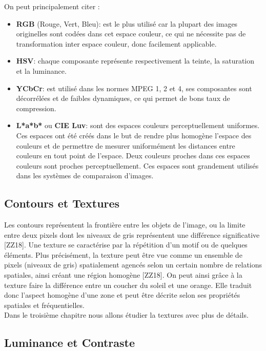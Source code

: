 On peut principalement citer :
\begin{itemize}
	\item \textbf{RGB} (Rouge, Vert, Bleu): est le plus utilisé car la plupart des images originelles sont codées dans cet espace couleur, ce qui ne nécessite pas de transformation inter espace couleur, donc facilement applicable.
	
	\item \textbf{HSV}: chaque composante représente respectivement la teinte, la saturation et la luminance.
	
	\item \textbf{YCbCr}: est utilisé dans les normes MPEG 1, 2 et 4, ses composantes sont décorrélées et de faibles dynamiques, ce qui permet de bons taux de compression.
	
	\item \textbf{L*a*b*} ou \textbf{CIE Luv}: sont des espaces couleurs perceptuellement uniformes. Ces espaces ont été créés dans le but de rendre plus homogène l’espace des couleurs et de
	permettre de mesurer uniformément les distances entre couleurs en tout point de l'espace. Deux couleurs proches dans ces espaces couleurs sont proches perceptuellement. Ces espaces sont grandement utilisés dans les systèmes de comparaison d'images.
\end{itemize}

\subsection{Contours et Textures}
Les contours représentent la frontière entre les objets de l’image, ou la
limite entre deux pixels dont les niveaux de gris représentent une différence significative [ZZ18]. Une texture se caractérise par la répétition d’un motif ou de quelques éléments. Plus précisément, la texture peut être vue comme un ensemble de pixels (niveaux de gris) spatialement agencés selon un certain nombre de relations spatiales, ainsi créant une région homogène [ZZ18]. On peut ainsi grâce à la texture faire la différence entre un coucher du soleil et une orange. Elle traduit donc l’aspect homogène d’une zone et peut être décrite selon ses propriétés spatiales et fréquentielles.\\

Dans le troisième chapitre nous allons étudier la textures avec plus de détails.

\subsection{Luminance et Contraste}

